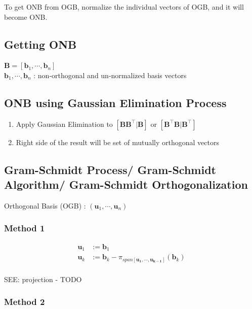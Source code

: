 To get ONB from OGB, normalize the individual vectors of OGB, and it will become ONB.

\subsection*{Getting ONB \cite{mfml-1}}
$\mathbf{B} = [\mathbf{b}_1, \cdots, \mathbf{b}_n]$\\
$\mathbf{b}_1, \cdots, \mathbf{b}_n$ : non-orthogonal and un-normalized basis vectors

\subsection{ONB using Gaussian Elimination Process \cite{jstor/2324877-Gram-Schmidt-Orthogonalization-by-Gauss-Elimination}}\label{ONB using Gaussian Elimination Process}

\begin{enumerate}
    \item Apply Gaussian Elimination to $[\mathbf{BB}^\top|\mathbf{B}]$ or $[\mathbf{B^\top B}|\mathbf{B}^\top]$

    \item Right side of the result will be set of mutually orthogonal vectors
\end{enumerate}

\subsection{Gram-Schmidt Process/ Gram-Schmidt Algorithm/ Gram-Schmidt Orthogonalization \cite{mfml-1}}\label{Gram-Schmidt Process/ Gram-Schmidt Algorithm/ Gram-Schmidt Orthogonalization}

Orthogonal Basis (OGB) : $(\mathbf{u}_1, \cdots ,\mathbf{u}_n)$

\subsubsection*{Method 1 \cite{mfml-1}}

\[
\begin{aligned}
    \mathbf{u}_1 &:= \mathbf{b}_1 \\
    \mathbf{u}_k &:= \mathbf{b}_k - \pi_{span[\mathbf{u_1, \cdots, u_{k-1}}]}(\mathbf{b}_k) \\
\end{aligned}
\]

SEE: projection - TODO

\subsubsection*{Method 2 \cite{youtube/UOZjINOGLog-Gram-Schmidt-Orthogonalisation-Process}}

